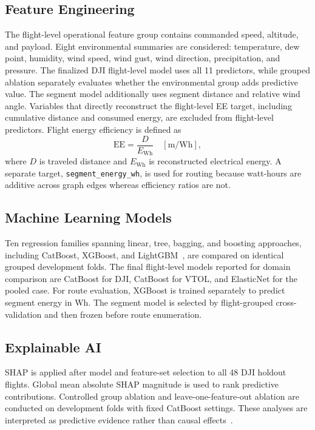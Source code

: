 \documentclass[conference,a4paper]{IEEEtran}
\begin{document}
\subsection{Feature Engineering}
The flight-level operational feature group contains commanded speed, altitude, and payload. Eight environmental summaries are considered: temperature, dew point, humidity, wind speed, wind gust, wind direction, precipitation, and pressure. The finalized DJI flight-level model uses all 11 predictors, while grouped ablation separately evaluates whether the environmental group adds predictive value. The segment model additionally uses segment distance and relative wind angle. Variables that directly reconstruct the flight-level EE target, including cumulative distance and consumed energy, are excluded from flight-level predictors. Flight energy efficiency is defined as
\begin{equation}
\mathrm{EE}=\frac{D}{E_{\mathrm{Wh}}}\quad [\mathrm{m/Wh}],
\end{equation}
where $D$ is traveled distance and $E_{\mathrm{Wh}}$ is reconstructed electrical energy. A separate target, \texttt{segment\_energy\_wh}, is used for routing because watt-hours are additive across graph edges whereas efficiency ratios are not.

\subsection{Machine Learning Models}
Ten regression families spanning linear, tree, bagging, and boosting approaches, including CatBoost, XGBoost, and LightGBM~\cite{catboost2018,xgboost2016,lightgbm2017}, are compared on identical grouped development folds. The final flight-level models reported for domain comparison are CatBoost for DJI, CatBoost for VTOL, and ElasticNet for the pooled case. For route evaluation, XGBoost is trained separately to predict segment energy in Wh. The segment model is selected by flight-grouped cross-validation and then frozen before route enumeration.

\subsection{Explainable AI}
SHAP is applied after model and feature-set selection to all 48 DJI holdout flights. Global mean absolute SHAP magnitude is used to rank predictive contributions. Controlled group ablation and leave-one-feature-out ablation are conducted on development folds with fixed CatBoost settings. These analyses are interpreted as predictive evidence rather than causal effects~\cite{lundberg2017,janzing2020,kumar2020,aas2021}.
\end{document}

